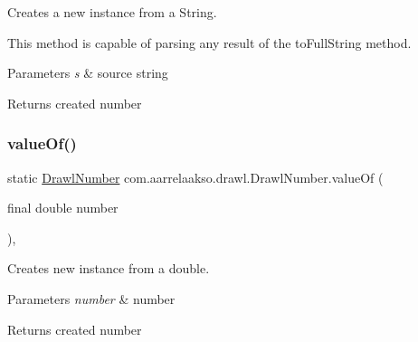Creates a new instance from a String. 

This method is capable of parsing any result of the to\+Full\+String method.


\begin{DoxyParams}{Parameters}
{\em s} & source string \\
\hline
\end{DoxyParams}
\begin{DoxyReturn}{Returns}
created number 
\end{DoxyReturn}
\mbox{\label{classcom_1_1aarrelaakso_1_1drawl_1_1_drawl_number_ad1ddd1e2141d9534bd7270093a9fa172}} 
\subsubsection{\texorpdfstring{value\+Of()}{valueOf()}\hspace{0.1cm}{\footnotesize\ttfamily [2/5]}}
{\footnotesize\ttfamily static \hyperlink{classcom_1_1aarrelaakso_1_1drawl_1_1_drawl_number}{Drawl\+Number} com.\+aarrelaakso.\+drawl.\+Drawl\+Number.\+value\+Of (\begin{DoxyParamCaption}\item[{final double}]{number }\end{DoxyParamCaption})\hspace{0.3cm}{\ttfamily [static]}, {\ttfamily [package]}}



Creates new instance from a double. 


\begin{DoxyParams}{Parameters}
{\em number} & number \\
\hline
\end{DoxyParams}
\begin{DoxyReturn}{Returns}
created number 
\end{DoxyReturn}
\mbox{\label{classcom_1_1aarrelaakso_1_1drawl_1_1_drawl_number_aa32f1562e31e27ca9322b92babebd9b3}} 
